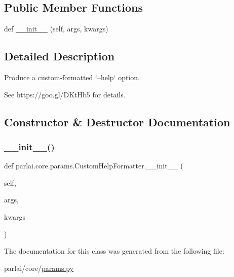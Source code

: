 \subsection*{Public Member Functions}
\begin{DoxyCompactItemize}
\item 
def \hyperlink{classparlai_1_1core_1_1params_1_1CustomHelpFormatter_a4111203088995f375f8679fee61020b0}{\+\_\+\+\_\+init\+\_\+\+\_\+} (self, args, kwargs)
\end{DoxyCompactItemize}


\subsection{Detailed Description}
\begin{DoxyVerb}Produce a custom-formatted `--help` option.

See https://goo.gl/DKtHb5 for details.
\end{DoxyVerb}
 

\subsection{Constructor \& Destructor Documentation}
\mbox{\label{classparlai_1_1core_1_1params_1_1CustomHelpFormatter_a4111203088995f375f8679fee61020b0}} 
\subsubsection{\texorpdfstring{\+\_\+\+\_\+init\+\_\+\+\_\+()}{\_\_init\_\_()}}
{\footnotesize\ttfamily def parlai.\+core.\+params.\+Custom\+Help\+Formatter.\+\_\+\+\_\+init\+\_\+\+\_\+ (\begin{DoxyParamCaption}\item[{}]{self,  }\item[{}]{args,  }\item[{}]{kwargs }\end{DoxyParamCaption})}



The documentation for this class was generated from the following file\+:\begin{DoxyCompactItemize}
\item 
parlai/core/\hyperlink{params_8py}{params.\+py}\end{DoxyCompactItemize}
